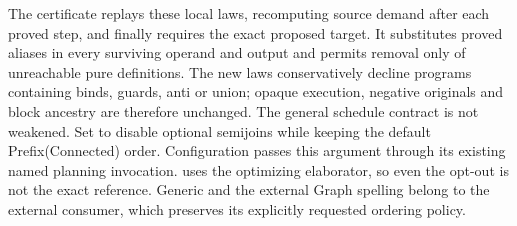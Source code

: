 The certificate replays these local laws, recomputing source demand after
each proved step, and finally requires the exact proposed target. It
substitutes proved aliases in every surviving operand and output and permits
removal only of unreachable pure definitions. The new laws conservatively
decline programs containing binds, guards, anti or union; opaque execution,
negative originals and block ancestry are therefore unchanged. The general
schedule contract is not weakened.
Set
to disable optional semijoins while keeping the default Prefix(Connected)
order. Configuration
passes this argument through its existing named planning invocation.
 uses the optimizing elaborator, so even the opt-out is not
the exact reference. Generic and the external Graph spelling belong to the
external  consumer, which preserves its explicitly requested
ordering policy.

